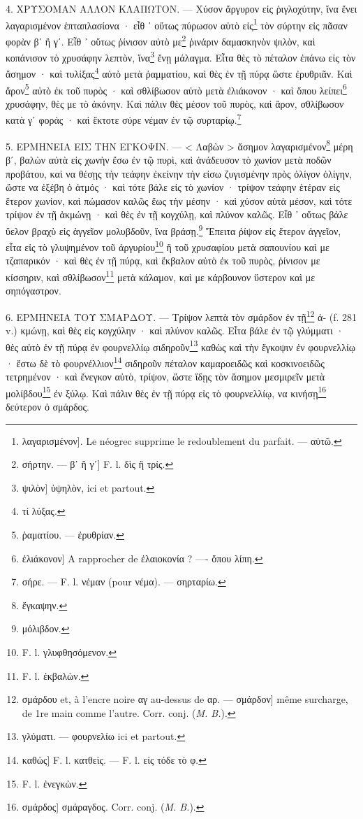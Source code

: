 \documentclass[a4paper, 11pt, oneside, polutonikogreek, french]{article}
\begin{document}
4. ΧΡΥΣΟΜΑΝ ΑΛΛΟΝ ΚΛΑΠΩΤΟΝ. --- Χύσον ἄργυρον εἰς ῥιγλοχύτην, ἵνα ἔνει λαγαρισμένον ἑπταπλασίονα · εἶθ ᾽ οὕτως πύρωσον αὐτὸ εἰς\footnote{λαγαρισμένον]. Le néogrec supprime le redoublement du parfait. --- αὐτῶ.} τὸν σύρτην εἰς πᾶσαν φορὰν βʹ ἢ γʹ. Εἶθ ᾽ οὕτως ῥίνισον αὐτὸ με\footnote{σήρτην. --- βʹ ἢ γʹ] F. l. δὶς ἢ τρίς.} ῥινάριν δαμασκηνὸν ψιλὸν, καὶ κοπάνισον τὸ χρυσάφην λεπτὸν, ἵνα\footnote{ψιλὸν] ὑψηλὸν, ici et partout.} ἔνῃ μάλαγμα. Εἶτα θὲς τὸ πέταλον ἐπάνω εἰς τὸν ἄσημον · καὶ τυλίξας\footnote{τί λύξας.} αὐτὸ μετὰ ῥαμματίου, καὶ θὲς ἐν τῇ πύρᾳ ὥστε ἐρυθριᾶν. Καὶ ἄρον\footnote{ῥαματίου. --- ἐρυθρίαν.} αὐτὸ ἐκ τοῦ πυρὸς · καὶ σθλίβωσον αὐτὸ μετὰ ἐλιάκονον · καὶ ὅπου λείπει\footnote{ἐλιάκονον] A rapprocher de ἐλαιοκονία ? ---- ὅπου λίπη.} χρυσάφην, θὲς με τὸ ἀκόνην. Καὶ πάλιν θὲς μέσον τοῦ πυρὸς, καὶ ἄρον, σθλίβωσον κατὰ γʹ φοράς · καὶ ἔκτοτε σύρε νέμαν ἐν τῷ συρταρίῳ.\footnote{σήρε. --- F. l. νέμαν (pour νέμα). --- σηρταρίω.}

5. ΕΡΜΗΝΕΙΑ ΕΙΣ ΤΗΝ ΕΓΚΟΨΙΝ. --- < Λαβὼν > ἄσημον λαγαρισμένον\footnote{ἔγκαψην.} μέρη βʹ, βαλὼν αὐτὰ εἰς χωνὴν ἔσω ἐν τῷ πυρὶ, καὶ ἀνάδευσον τὸ χωνίον μετὰ ποδῶν προβάτου, καὶ να θέσῃς τὴν τεάφην ἐκείνην τὴν εἰσω ζυγισμένην πρὸς ὀλίγον ὀλίγην, ὥστε να ἐξέβη ὁ ἀτμός · καὶ τότε βάλε εἰς τὸ χωνίον · τρίψον τεάφην ἑτέραν εἰς ἕτερον χωνίον, καὶ πώμασον καλῶς ἔως τὴν μέσην · καὶ χύσον αὐτὰ μέσον, καὶ τότε τρίψον ἐν τῇ ἀκμώνῃ · καὶ θὲς ἐν τῇ κογχύλῃ, καὶ πλύνον καλῶς. Εἷθ ᾽ οὕτως βάλε ὕελον βραχὺ εἰς ἀγγεῖον μολυβδοῦν, ἵνα βράσῃ.\footnote{μόλιβδον.} Ἔπειτα ῥίψον εἰς ἕτερον ἀγγεῖον, εἶτα εἰς τὸ γλυψημένον τοῦ ἀργυρίου\footnote{F. l. γλυφθησόμενον.} ἢ τοῦ χρυσαφίου μετὰ σαπουνίου καὶ με τζαπαρικόν · καὶ θὲς ἐν τῇ πύρᾳ, καὶ ἔκβαλον αὐτὸ ἐκ τοῦ πυρὸς, ῥίνισον με κίσσηριν, καὶ σθλίβωσον\footnote{F. l. ἐκβαλὼν.} μετὰ κάλαμον, καὶ με κάρβουνον ὕστερον καὶ με σηπόγαστρον.

6. ΕΡΜΗΝΕΙΑ ΤΟΥ ΣΜΑΡΔΟΥ. --- Τρίψον λεπτὰ τὸν σμάρδον ἐν τῇ\footnote{σμάρδου et, à l'encre noire αγ au-dessus de αρ. --- σμάρδον] même surcharge, de 1re main comme l'autre. Corr. conj. (\emph{M. B.}).} ἀ- (f. 281 v.) κμώνῃ, καὶ θὲς εἰς κογχύλην · καὶ πλύνον καλῶς. Εἶτα βάλε ἐν τῷ γλύμματι · θὲς αὐτὸ ἐν τῇ πύρᾳ ἐν φουρνελλίῳ σιδηροῦν\footnote{γλύματι. --- φουρνελίω ici et partout.} καθὼς καὶ τὴν ἔγκοψιν ἐν φουρνελλίῳ · ἔστω δὲ τὸ φουρνέλλιον\footnote{καθὼς] F. l. κατθεὶς. --- F. l. εἰς τόδε τὸ φ.} σιδηροῦν πέταλον καμαροειδῶς καὶ κοσκινοειδῶς τετρημένον · καὶ ἔνεγκον αὐτὸ, τρίψον, ὥστε ἴδῃς τὸν ἄσημον μεσμιρεῖν μετὰ μολίβδου\footnote{F. l. ἐνεγκὼν.} ἐν ξύλῳ. Καὶ πάλιν θὲς ἐν τῇ πύρᾳ εἰς τὸ φουρνελλίῳ, να κινήσῃ\footnote{σμάρδος] σμάραγδος. Corr. conj. (\emph{M. B.}).} δεύτερον ὁ σμάρδος.
\end{document}
